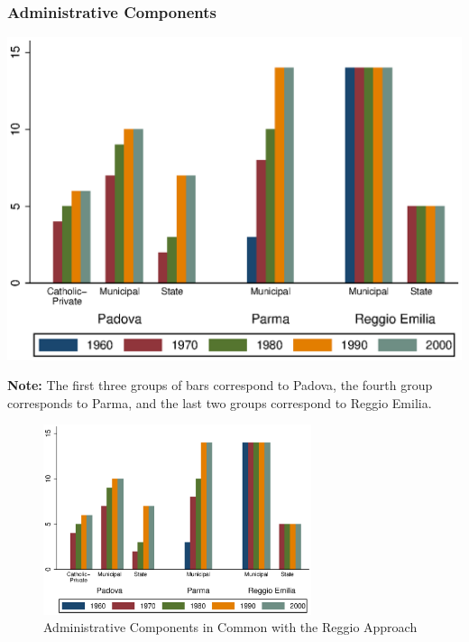 \documentclass[static]{JJH-Beamer_PAGENOS}
\begin{document}
\begin{frame}
\frametitle{Administrative Components}
\begin{center}
\includegraphics[scale=0.7]{../../output/aggregateAdministrative.eps}
\end{center}
\tiny{\textbf{Note:} The first three groups of bars correspond to Padova, the fourth group corresponds to Parma, and the last two groups correspond to Reggio Emilia.}
 
\centering
\begin{figure}[H]
\caption{Administrative Components in Common with the Reggio Approach}
\includegraphics[width=0.7\textwidth]{../../output/aggregateAdministrative.eps}
\end{figure}
\end{frame}

\end{document}
